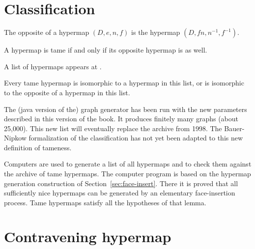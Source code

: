 \section{Classification}
    \label{sec:proof-classification}

\label{sec:classification}




\begin{definition}[opposite] The opposite of a hypermap $(D,e,n,f)$ is the
hypermap $(D,f n,n^{-1},f^{-1})$.
\end{definition}

\begin{lemma}\label{140} 
A hypermap is tame if and only if its opposite hypermap is as well.
\end{lemma}

A list of hypermaps appears at \cite{website:Hales:1998:Code}.

\begin{theorem}
\label{theorem:classification} Every tame hypermap is isomorphic to
a hypermap in this list, or is isomorphic to the opposite of a
hypermap in this list.
\end{theorem}

\begin{note}%
The (java version of the) graph generator has been run with the new parameters described in this version of the book.  It produces finitely many graphs (about 25,000).  This new list will eventually replace the archive from 1998.  The Bauer-Nipkow formalization of the classification has not yet been adapted to this new definition of tameness.
\end{note}


Computers are used to generate a list of all hypermaps and to check
them against the archive of tame hypermaps.  The computer program is
based on the hypermap generation construction of Section~\ref{sec:face-insert}.  There it is
proved that all sufficiently nice hypermaps can be generated by an
elementary face-insertion process.  Tame hypermaps satisfy all the
hypotheses of that lemma.

\section{Contravening hypermap}

